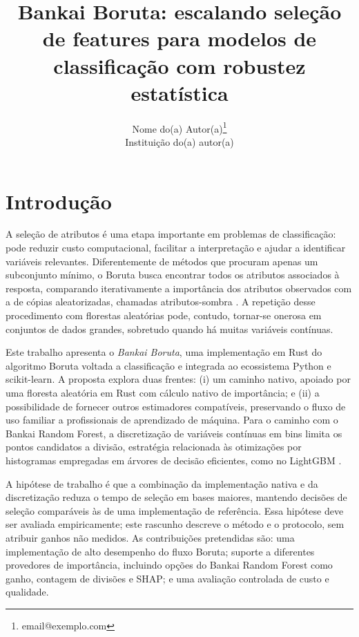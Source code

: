 \documentclass[a4,11pt]{wmecai}
\begin{document}
\title{Bankai Boruta: escalando seleção de features para modelos de classificação com robustez estatística}

\author{
{\large Nome do(a) Autor(a)}\thanks{email@exemplo.com}\\
{\small Instituição do(a) autor(a)}\\
}

\criartitulo

\section{Introdução}
A seleção de atributos é uma etapa importante em problemas de classificação: pode reduzir custo computacional, facilitar a interpretação e ajudar a identificar variáveis relevantes. Diferentemente de métodos que procuram apenas um subconjunto mínimo, o Boruta busca encontrar todos os atributos associados à resposta, comparando iterativamente a importância dos atributos observados com a de cópias aleatorizadas, chamadas atributos-sombra \cite{Kursa}. A repetição desse procedimento com florestas aleatórias pode, contudo, tornar-se onerosa em conjuntos de dados grandes, sobretudo quando há muitas variáveis contínuas.

Este trabalho apresenta o \textit{Bankai Boruta}, uma implementação em Rust do algoritmo Boruta voltada a classificação e integrada ao ecossistema Python e scikit-learn. A proposta explora duas frentes: (i) um caminho nativo, apoiado por uma floresta aleatória em Rust com cálculo nativo de importância; e (ii) a possibilidade de fornecer outros estimadores compatíveis, preservando o fluxo de uso familiar a profissionais de aprendizado de máquina. Para o caminho com o Bankai Random Forest, a discretização de variáveis contínuas em bins limita os pontos candidatos a divisão, estratégia relacionada às otimizações por histogramas empregadas em árvores de decisão eficientes, como no LightGBM \cite{Ke}.

A hipótese de trabalho é que a combinação da implementação nativa e da discretização reduza o tempo de seleção em bases maiores, mantendo decisões de seleção comparáveis às de uma implementação de referência. Essa hipótese deve ser avaliada empiricamente; este rascunho descreve o método e o protocolo, sem atribuir ganhos não medidos. As contribuições pretendidas são: uma implementação de alto desempenho do fluxo Boruta; suporte a diferentes provedores de importância, incluindo opções do Bankai Random Forest como ganho, contagem de divisões e SHAP; e uma avaliação controlada de custo e qualidade.
\end{document}

